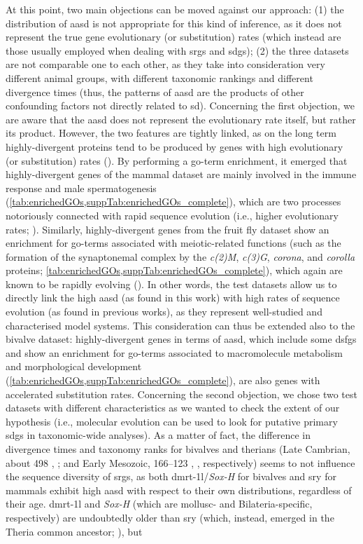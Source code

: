 At this point, two main objections can be moved against our approach: (1) the distribution of \gls{aasd} is not appropriate for this kind of inference, as it does not represent the true gene evolutionary (or substitution) rates (which instead are those usually employed when dealing with \glspl{srg} and \glspl{sdg}); (2) the three datasets are not comparable one to each other, as they take into consideration very different animal groups, with different taxonomic rankings and different divergence times (thus, the patterns of \gls{aasd} are the products of other confounding factors not directly related to \gls{sd}). Concerning the first objection, we are aware that the \gls{aasd} does not represent the evolutionary rate itself, but rather its product. However, the two features are tightly linked, as on the long term highly-divergent proteins tend to be produced by genes with high evolutionary (or substitution) rates (). By performing a \gls{go}-term enrichment, it emerged that highly-divergent genes of the mammal dataset are mainly involved in the immune response and male spermatogenesis (\cref{tab:enrichedGOs,suppTab:enrichedGOs_complete}), which are two processes notoriously connected with rapid sequence evolution (i.e., higher evolutionary rates; ). Similarly, highly-divergent genes from the fruit fly dataset show an enrichment for \gls{go}-terms associated with meiotic-related functions (such as the formation of the synaptonemal complex by the \textit{c(2)M}, \textit{c(3)G}, \textit{corona}, and \textit{corolla} proteins; \cref{tab:enrichedGOs,suppTab:enrichedGOs_complete}), which again are known to be rapidly evolving (). In other words, the test datasets allow us to directly link the high \gls{aasd} (as found in this work) with high rates of sequence evolution (as found in previous works), as they represent well-studied and characterised model systems. This consideration can thus be extended also to the bivalve dataset: highly-divergent genes in terms of \gls{aasd}, which include some \glspl{dsfg} and show an enrichment for \gls{go}-terms associated to macromolecule metabolism and morphological development (\cref{tab:enrichedGOs,suppTab:enrichedGOs_complete}), are also genes with accelerated substitution rates. Concerning the second objection, we chose two test datasets with different characteristics as we wanted to check the extent of our hypothesis (i.e., molecular evolution can be used to look for putative primary \glspl{sdg} in taxonomic-wide analyses). As a matter of fact, the difference in divergence times and taxonomy ranks for bivalves and therians (Late Cambrian, about 498 , ; and Early Mesozoic, 166--123 , , respectively) seems to not influence the sequence diversity of \glspl{srg}, as both \gls{dmrt-1l}/\textit{Sox-H} for bivalves and \gls{sry} for mammals exhibit high \gls{aasd} with respect to their own distributions, regardless of their age. \gls{dmrt-1l} and \textit{Sox-H} (which are mollusc- and Bilateria-specific, respectively) are undoubtedly older than \gls{sry} (which, instead, emerged in the Theria common ancestor; ), but 